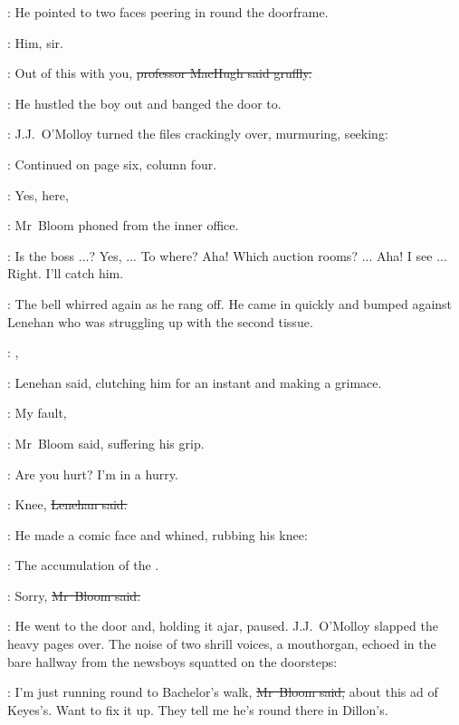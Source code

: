:
He pointed to two faces peering in round the doorframe.

\boy:
Him, sir.

\machugh:
Out of this with you,
\sout{professor MacHugh said gruffly.}

:
He hustled the boy out and banged the door to.

:
J.J.~O'Molloy turned the files crackingly over,
murmuring,
seeking:

\jjom:
Continued on page six, column four.

\Bloom:
Yes,  here,

:
Mr~Bloom phoned from the inner office.

\Bloom:
Is the boss ...?
Yes,  ...
To where?
Aha!
Which auction rooms? ...
Aha!
I see ...
Right.
I'll catch him.



:
The bell whirred again as he rang off.
He came in quickly and bumped against Lenehan
who was struggling up with the second tissue.

\lenehan:
,

:
Lenehan said,
clutching him for an instant
and making a grimace.

\Bloom:
My fault,

:
Mr~Bloom said,
suffering his grip.

\Bloom:
Are you hurt?
I'm in a hurry.

\lenehan:
Knee,
\sout{Lenehan said.}

:
He made a comic face and whined,
rubbing his knee:

\lenehan:
The accumulation of the .

\Bloom:
Sorry,
\sout{Mr~Bloom said.}

:
He went to the door
and, holding it ajar,
paused.
J.J.~O'Molloy slapped the heavy pages over.
The noise of two shrill voices,
a mouthorgan,
echoed in the bare hallway
from the newsboys squatted on the doorsteps:




\Bloom:
I'm just running round to Bachelor's walk,
\sout{Mr~Bloom said,}
about this ad of Keyes's.
Want to fix it up.
They tell me he's round there in Dillon's.

